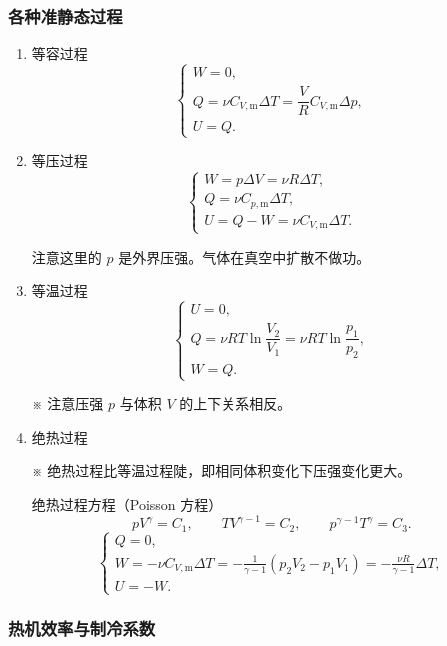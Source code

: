 \documentclass[UTF8,fontset=fandol,zihao=5]{ctexart}
\begin{document}
\subsubsection{各种准静态过程}

\begin{enumerate}
  \item 等容过程
  \[
    \begin{cases}
      W=0,\\
      Q=\nu C_{V,\mathrm m}\Delta T=\dfrac VR C_{V,\mathrm m}\Delta p,\\
      U=Q.
    \end{cases}
  \]

  \item 等压过程
  \[
    \begin{cases}
      W=p\Delta V=\nu R\Delta T,\\
      Q=\nu C_{p,\mathrm m}\Delta T,\\
      U=Q-W=\nu C_{V,\mathrm m}\Delta T.
    \end{cases}
  \]

  注意这里的 \(p\) 是外界压强。气体在真空中扩散不做功。

  \item 等温过程
  \[
    \begin{cases}
      U=0,\\
      Q=\nu RT\ln\dfrac{V_2}{V_1}=\nu RT\ln\dfrac{p_1}{p_2},\\
      W=Q.
    \end{cases}
  \]

  ※ 注意压强 \(p\) 与体积 \(V\) 的上下关系相反。

  \item 绝热过程

  ※ 绝热过程比等温过程陡，即相同体积变化下压强变化更大。

  绝热过程方程（Poisson 方程）
  \[
    pV^\gamma=C_1,
    \qquad
    TV^{\gamma-1}=C_2,
    \qquad
    p^{\gamma-1}T^\gamma=C_3.
  \]
  \[
    \begin{cases}
      Q=0,\\
      \displaystyle W=-\nu C_{V,\mathrm m}\Delta T
      =-\frac{1}{\gamma-1}(p_2V_2-p_1V_1)
      =-\frac{\nu R}{\gamma-1}\Delta T,\\[4pt]
      U=-W.
    \end{cases}
  \]
\end{enumerate}

\subsubsection{热机效率与制冷系数}
\end{document}
